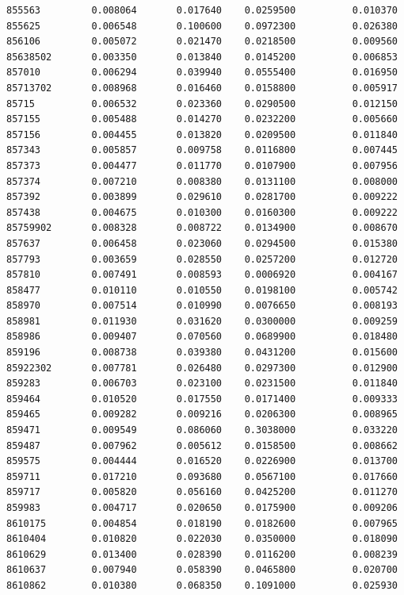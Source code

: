 \documentclass[
  letterpaper,
  DIV=11,
  numbers=noendperiod]{scrartcl}
\begin{document}
\begin{verbatim}
855563         0.008064       0.017640    0.0259500          0.010370
855625         0.006548       0.100600    0.0972300          0.026380
856106         0.005072       0.021470    0.0218500          0.009560
85638502       0.003350       0.013840    0.0145200          0.006853
857010         0.006294       0.039940    0.0555400          0.016950
85713702       0.008968       0.016460    0.0158800          0.005917
85715          0.006532       0.023360    0.0290500          0.012150
857155         0.005488       0.014270    0.0232200          0.005660
857156         0.004455       0.013820    0.0209500          0.011840
857343         0.005857       0.009758    0.0116800          0.007445
857373         0.004477       0.011770    0.0107900          0.007956
857374         0.007210       0.008380    0.0131100          0.008000
857392         0.003899       0.029610    0.0281700          0.009222
857438         0.004675       0.010300    0.0160300          0.009222
85759902       0.008328       0.008722    0.0134900          0.008670
857637         0.006458       0.023060    0.0294500          0.015380
857793         0.003659       0.028550    0.0257200          0.012720
857810         0.007491       0.008593    0.0006920          0.004167
858477         0.010110       0.010550    0.0198100          0.005742
858970         0.007514       0.010990    0.0076650          0.008193
858981         0.011930       0.031620    0.0300000          0.009259
858986         0.009407       0.070560    0.0689900          0.018480
859196         0.008738       0.039380    0.0431200          0.015600
85922302       0.007781       0.026480    0.0297300          0.012900
859283         0.006703       0.023100    0.0231500          0.011840
859464         0.010520       0.017550    0.0171400          0.009333
859465         0.009282       0.009216    0.0206300          0.008965
859471         0.009549       0.086060    0.3038000          0.033220
859487         0.007962       0.005612    0.0158500          0.008662
859575         0.004444       0.016520    0.0226900          0.013700
859711         0.017210       0.093680    0.0567100          0.017660
859717         0.005820       0.056160    0.0425200          0.011270
859983         0.004717       0.020650    0.0175900          0.009206
8610175        0.004854       0.018190    0.0182600          0.007965
8610404        0.010820       0.022030    0.0350000          0.018090
8610629        0.013400       0.028390    0.0116200          0.008239
8610637        0.007940       0.058390    0.0465800          0.020700
8610862        0.010380       0.068350    0.1091000          0.025930

\end{verbatim}
\end{document}
